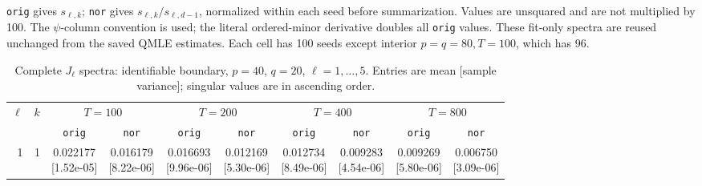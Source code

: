 \documentclass[12pt,letterpaper]{article}
\def\spacingset#1{\renewcommand{\baselinestretch}{#1}\small\normalsize}
\theoremstyle{plain}
\theoremstyle{definition}
\begin{document}
\begin{table}[p]
\begin{adjustbox}{max width=\linewidth}
\begin{tabular}{@{}rr*{8}{c}@{}}
\bottomrule
\end{tabular}
\end{adjustbox}
\par\smallskip
\begin{minipage}{0.98\linewidth}\footnotesize
\texttt{orig} gives $s_{\ell,k}$; \texttt{nor} gives $s_{\ell,k}/s_{\ell,d-1}$, normalized within each seed before summarization. Values are unsquared and are not multiplied by 100. The $\psi$-column convention is used; the literal ordered-minor derivative doubles all \texttt{orig} values. These fit-only spectra are reused unchanged from the saved QMLE estimates. Each cell has 100 seeds except interior $p=q=80,T=100$, which has 96.
\end{minipage}
\endgroup
\end{table}
\clearpage
\begin{table}[p]
\begingroup
\spacingset{1.0}
\small\centering
\caption{Complete $J_\ell$ spectra: identifiable boundary, $p=40$, $q=20$, $\ell=1,\ldots,5$. Entries are mean [sample variance]; singular values are in ascending order.}
\label{s23:lambda:alltab:spectra:p40q20boundary:1-5}
\footnotesize
\setlength{\tabcolsep}{2.2pt}
\renewcommand{\arraystretch}{1.03}
\begin{adjustbox}{max width=\linewidth}
\begin{tabular}{@{}rr*{8}{c}@{}}
\toprule
$\ell$ & $k$ & \multicolumn{2}{c}{$T=100$} & \multicolumn{2}{c}{$T=200$} & \multicolumn{2}{c}{$T=400$} & \multicolumn{2}{c}{$T=800$}\\
\cmidrule(lr){3-4}\cmidrule(lr){5-6}\cmidrule(lr){7-8}\cmidrule(lr){9-10}
 &  & \texttt{orig} & \texttt{nor} & \texttt{orig} & \texttt{nor} & \texttt{orig} & \texttt{nor} & \texttt{orig} & \texttt{nor}\\
\midrule
1 & 1 & \shortstack{0.022177\\[-1pt]{\scriptsize[1.52e-05]}} & \shortstack{0.016179\\[-1pt]{\scriptsize[8.22e-06]}} & \shortstack{0.016693\\[-1pt]{\scriptsize[9.96e-06]}} & \shortstack{0.012169\\[-1pt]{\scriptsize[5.30e-06]}} & \shortstack{0.012734\\[-1pt]{\scriptsize[8.49e-06]}} & \shortstack{0.009283\\[-1pt]{\scriptsize[4.54e-06]}} & \shortstack{0.009269\\[-1pt]{\scriptsize[5.80e-06]}} & \shortstack{0.006750\\[-1pt]{\scriptsize[3.09e-06]}}\\

\end{tabular}
\end{adjustbox}
\end{table}
\end{document}
